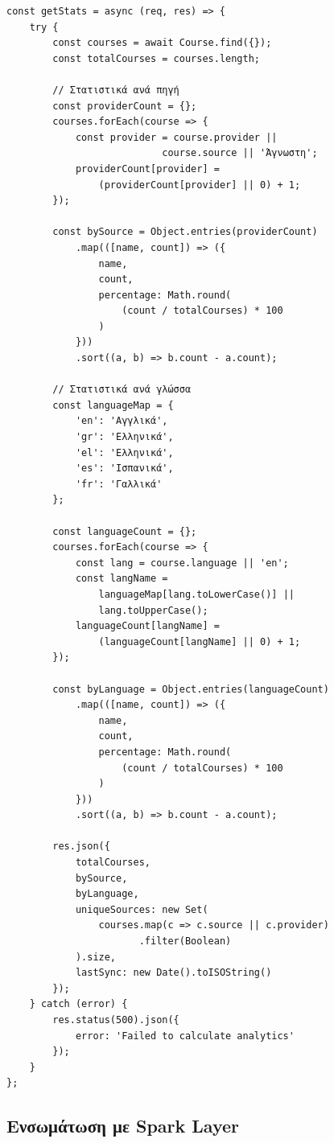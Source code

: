 \documentclass[a4paper,12pt]{article}
\begin{document}
\begin{verbatim}
const getStats = async (req, res) => {
    try {
        const courses = await Course.find({});
        const totalCourses = courses.length;

        // Στατιστικά ανά πηγή
        const providerCount = {};
        courses.forEach(course => {
            const provider = course.provider || 
                           course.source || 'Άγνωστη';
            providerCount[provider] = 
                (providerCount[provider] || 0) + 1;
        });
        
        const bySource = Object.entries(providerCount)
            .map(([name, count]) => ({
                name,
                count,
                percentage: Math.round(
                    (count / totalCourses) * 100
                )
            }))
            .sort((a, b) => b.count - a.count);

        // Στατιστικά ανά γλώσσα
        const languageMap = {
            'en': 'Αγγλικά',
            'gr': 'Ελληνικά',
            'el': 'Ελληνικά',
            'es': 'Ισπανικά',
            'fr': 'Γαλλικά'
        };
        
        const languageCount = {};
        courses.forEach(course => {
            const lang = course.language || 'en';
            const langName = 
                languageMap[lang.toLowerCase()] || 
                lang.toUpperCase();
            languageCount[langName] = 
                (languageCount[langName] || 0) + 1;
        });

        const byLanguage = Object.entries(languageCount)
            .map(([name, count]) => ({
                name,
                count,
                percentage: Math.round(
                    (count / totalCourses) * 100
                )
            }))
            .sort((a, b) => b.count - a.count);

        res.json({
            totalCourses,
            bySource,
            byLanguage,
            uniqueSources: new Set(
                courses.map(c => c.source || c.provider)
                       .filter(Boolean)
            ).size,
            lastSync: new Date().toISOString()
        });
    } catch (error) {
        res.status(500).json({ 
            error: 'Failed to calculate analytics' 
        });
    }
};
\end{verbatim}

\subsection{Ενσωμάτωση με Spark Layer}
\end{document}
